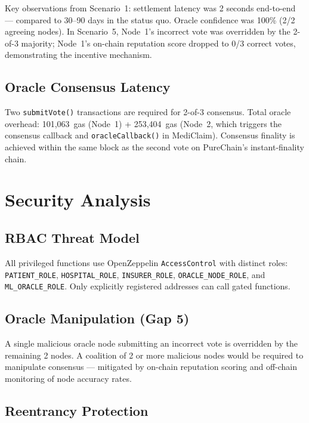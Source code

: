 \documentclass[journal]{IEEEtran}
\begin{document}
\noindent Key observations from Scenario~1: settlement latency was 2 seconds
end-to-end — compared to 30--90 days in the status quo. Oracle confidence
was 100\% (2/2 agreeing nodes). In Scenario~5, Node~1's incorrect vote was
overridden by the 2-of-3 majority; Node~1's on-chain reputation score dropped
to 0/3 correct votes, demonstrating the incentive mechanism.

\subsection{Oracle Consensus Latency}

Two \texttt{submitVote()} transactions are required for 2-of-3 consensus.
Total oracle overhead: 101,063~gas (Node~1) + 253,404~gas (Node~2, which
triggers the consensus callback and \texttt{oracleCallback()} in MediClaim).
Consensus finality is achieved within the same block as the second vote on
PureChain's instant-finality chain.

\section{Security Analysis}
\label{sec:security}

\subsection{RBAC Threat Model}

All privileged functions use OpenZeppelin \texttt{AccessControl} with distinct
roles: \texttt{PATIENT\_ROLE}, \texttt{HOSPITAL\_ROLE}, \texttt{INSURER\_ROLE},
\texttt{ORACLE\_NODE\_ROLE}, and \texttt{ML\_ORACLE\_ROLE}. Only explicitly
registered addresses can call gated functions.

\subsection{Oracle Manipulation (Gap 5)}

A single malicious oracle node submitting an incorrect vote is overridden by
the remaining 2 nodes. A coalition of 2 or more malicious nodes would be
required to manipulate consensus — mitigated by on-chain reputation scoring
and off-chain monitoring of node accuracy rates.

\subsection{Reentrancy Protection}
\end{document}
